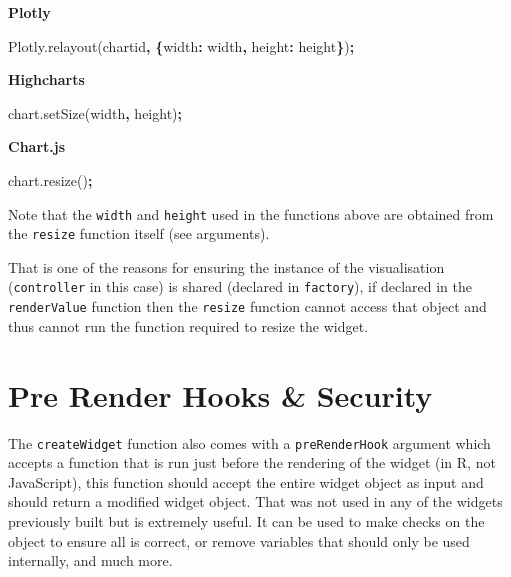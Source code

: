 \documentclass[
  10pt,
]{krantz}
\makeatletter
\newenvironment{Shaded}{\begin{snugshade}}{\end{snugshade}}
\newcommand{\AttributeTok}[1]{\textcolor[rgb]{0.61,0.61,0.61}{#1}}
\newcommand{\DataTypeTok}[1]{\textcolor[rgb]{0.27,0.27,0.27}{#1}}
\newcommand{\NormalTok}[1]{#1}
\newcommand{\OperatorTok}[1]{\textcolor[rgb]{0.43,0.43,0.43}{\textbf{#1}}}
\newcommand{\StringTok}[1]{\textcolor[rgb]{0.5,0.5,0.5}{#1}}
\newcommand{\VariableTok}[1]{\textcolor[rgb]{0,0,0}{#1}}
\newenvironment{kframe}{%
\medskip{}
\setlength{\fboxsep}{.8em}
 \def\at@end@of@kframe{}%
 \ifinner\ifhmode%
  \def\at@end@of@kframe{\end{minipage}}%
  \begin{minipage}{\columnwidth}%
 \fi\fi%
 \def\FrameCommand##1{\hskip\@totalleftmargin \hskip-\fboxsep
 \colorbox{shadecolor}{##1}\hskip-\fboxsep
     \hskip-\linewidth \hskip-\@totalleftmargin \hskip\columnwidth}%
 \MakeFramed {\advance\hsize-\width
   \@totalleftmargin\z@ \linewidth\hsize
   \@setminipage}}%
 {\par\unskip\endMakeFramed%
 \at@end@of@kframe}
\renewenvironment{Shaded}{\begin{kframe}}{\end{kframe}}
\makeatother
\begin{document}
\textbf{Plotly}

\begin{Shaded}
\begin{Highlighting}[]
\VariableTok{Plotly}\NormalTok{.}\AttributeTok{relayout}\NormalTok{(}\StringTok{\textquotesingle{}chartid\textquotesingle{}}\OperatorTok{,} \OperatorTok{\{}\DataTypeTok{width}\OperatorTok{:}\NormalTok{ width}\OperatorTok{,} \DataTypeTok{height}\OperatorTok{:}\NormalTok{ height}\OperatorTok{\}}\NormalTok{)}\OperatorTok{;}
\end{Highlighting}
\end{Shaded}

\textbf{Highcharts}

\begin{Shaded}
\begin{Highlighting}[]
\VariableTok{chart}\NormalTok{.}\AttributeTok{setSize}\NormalTok{(width}\OperatorTok{,}\NormalTok{ height)}\OperatorTok{;}
\end{Highlighting}
\end{Shaded}

\textbf{Chart.js}

\begin{Shaded}
\begin{Highlighting}[]
\VariableTok{chart}\NormalTok{.}\AttributeTok{resize}\NormalTok{()}\OperatorTok{;}
\end{Highlighting}
\end{Shaded}

Note that the \texttt{width} and \texttt{height} used in the functions above are obtained from the \texttt{resize} function itself (see arguments).

That is one of the reasons for ensuring the instance of the visualisation (\texttt{controller} in this case) is shared (declared in \texttt{factory}), if declared in the \texttt{renderValue} function then the \texttt{resize} function cannot access that object and thus cannot run the function required to resize the widget.

\hypertarget{widgets-adv-prerender}{%
\section{Pre Render Hooks \& Security}\label{widgets-adv-prerender}}

The \texttt{createWidget} function also comes with a \texttt{preRenderHook} argument which accepts a function that is run just before the rendering of the widget (in R, not JavaScript), this function should accept the entire widget object as input and should return a modified widget object. That was not used in any of the widgets previously built but is extremely useful. It can be used to make checks on the object to ensure all is correct, or remove variables that should only be used internally, and much more.
\end{document}

